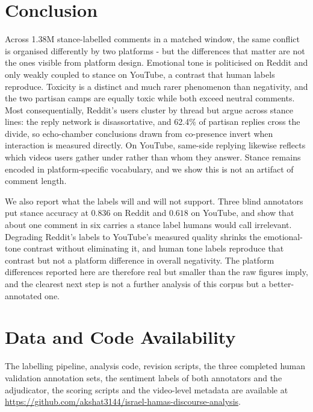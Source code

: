 \section{Conclusion}
Across 1.38M stance-labelled comments in a matched window, the same conflict is
organised differently by two platforms - but the differences that matter are not the
ones visible from platform design. Emotional tone is politicised on Reddit and only
weakly coupled to stance on YouTube, a contrast that human labels reproduce.
Toxicity is a distinct and much rarer phenomenon than negativity, and the two
partisan camps are equally toxic while both exceed neutral comments. Most consequentially, Reddit's users cluster by thread but
argue across stance lines: the reply network is disassortative, and 62.4\% of
partisan replies cross the divide, so echo-chamber conclusions drawn from co-presence
invert when interaction is measured directly. On YouTube, same-side replying likewise
reflects which videos users gather under rather than whom they answer. Stance remains encoded in
platform-specific vocabulary, and we show this is not an artifact of comment length.

We also report what the labels will and will not support. Three blind annotators put
stance accuracy at $0.836$ on Reddit and $0.618$ on YouTube, and show that about one
comment in six carries a stance label humans would call irrelevant. Degrading Reddit's
labels to YouTube's measured quality shrinks the emotional-tone contrast without
eliminating it, and human tone labels reproduce that contrast but not a platform
difference in overall negativity. The platform differences reported here are therefore real but smaller
than the raw figures imply, and the clearest next step is not a further analysis of
this corpus but a better-annotated one.

\section*{Data and Code Availability}
The labelling pipeline, analysis code, revision scripts, the three completed human
validation annotation sets, the sentiment labels of both annotators and the
adjudicator, the scoring scripts and the video-level metadata are
available at \url{https://github.com/akshat3144/israel-hamas-discourse-analysis}.





